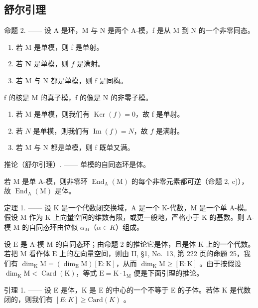 \subsection{舒尔引理}

命题 2. —— 设 A 是环，M 与 N 是两个 A-模，f 是从 M 到 N 的一个非零同态。

\begin{enumerate}
\def\labelenumi{\alph{enumi})}
\item
  若 M 是单模，则 f 是单射。
\item
  若 \(\mathbf{N}\) 是单模，则 \(f\) 是满射。
\item
  若 M 与 N 都是单模，则 f 是同构。
\end{enumerate}

f 的核是 M 的真子模，f 的像是 N 的非零子模。

\begin{enumerate}
\def\labelenumi{\alph{enumi})}
\item
  若 M 是单模，则我们有 \(\operatorname{Ker}(f)=0\)，故 f 是单射。
\item
  若 \(N\) 是单模，则我们有 \(\operatorname{Im}(f) = N\)，故 \(f\) 是满射。
\item
  若 M 与 N 都是单模，则 f 既单又满。
\end{enumerate}

推论（舒尔引理）. —— 单模的自同态环是体。

若 M 是单 A-模，则非零环 \(\operatorname{End}_{\mathrm{A}}(\mathrm{M})\) 的每个非零元素都可逆（命题 2, c)），故 \(\operatorname{End}_{\mathrm{A}}(\mathrm{M})\) 是体。

定理 1. —— 设 K 是一个代数闭交换域，A 是一个 K-代数，M 是一个单 A-模。假设 M 作为 K 上向量空间的维数有限，或更一般地，严格小于 K 的基数。则 A-模 M 的自同态环由位似 \(\alpha_{M}\)（\(\alpha \in K\)）组成。

设 \(\mathrm{E}\) 是 A-模 \(\mathrm{M}\) 的自同态环；由命题 2 的推论它是体，且是体 \(\mathrm{K}\) 上的一个代数。若把 \(\mathrm{M}\) 看作体 \(\mathrm{E}\) 上的左向量空间，则由 II, §1, No.~13, 第 222 页的命题 25，我们有 \(\dim_{\mathrm{K}} \mathrm{M} = (\dim_{\mathrm{E}} \mathrm{M})[\mathrm{E} : \mathrm{K}]\)，从而 \(\dim_{\mathrm{K}} \mathrm{M} \geqslant [\mathrm{E} : \mathrm{K}]\) 。由于按假设 \(\dim_{\mathrm{K}} \mathrm{M} < \operatorname{Card}(\mathrm{K})\)，等式 \(\mathrm{E} = \mathrm{K} \cdot 1_{\mathrm{M}}\) 便是下面引理的推论。

引理 1. —— 设 E 是体，K 是 E 的中心的一个不等于 E 的子体。若体 K 是代数闭的，则我们有 \([E:K] \geqslant \text{Card}(K)\) 。

